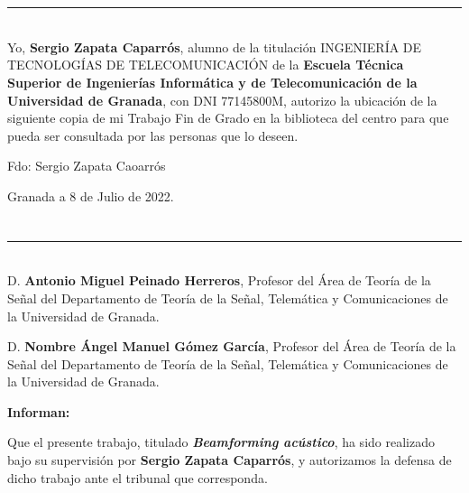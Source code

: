 \chapter*{}
\thispagestyle{empty}

\noindent\rule[-1ex]{\textwidth}{2pt}\\[4.5ex]

Yo, \textbf{Sergio Zapata Caparrós}, alumno de la titulación INGENIERÍA DE TECNOLOGÍAS DE TELECOMUNICACIÓN de la \textbf{Escuela Técnica Superior
de Ingenierías Informática y de Telecomunicación de la Universidad de Granada}, con DNI 77145800M, autorizo la
ubicación de la siguiente copia de mi Trabajo Fin de Grado en la biblioteca del centro para que pueda ser
consultada por las personas que lo deseen.

\vspace{6cm}

\noindent Fdo: Sergio Zapata Caoarrós

\vspace{2cm}

\begin{flushright}
Granada a 8 de Julio de 2022.
\end{flushright}


\chapter*{}
\thispagestyle{empty}

\noindent\rule[-1ex]{\textwidth}{2pt}\\[4.5ex]

D. \textbf{Antonio Miguel Peinado Herreros}, Profesor del Área de Teoría de la Señal del Departamento de Teoría de la Señal, Telemática y Comunicaciones de la Universidad de Granada.

\vspace{0.5cm}

D. \textbf{Nombre Ángel Manuel Gómez García}, Profesor del Área de Teoría de la Señal del Departamento de Teoría de la Señal, Telemática y Comunicaciones de la Universidad de Granada.


\vspace{0.5cm}

\textbf{Informan:}

\vspace{0.5cm}

Que el presente trabajo, titulado \textit{\textbf{Beamforming acústico}},
ha sido realizado bajo su supervisión por \textbf{Sergio Zapata Caparrós}, y autorizamos la defensa de dicho trabajo ante el tribunal
que corresponda.


